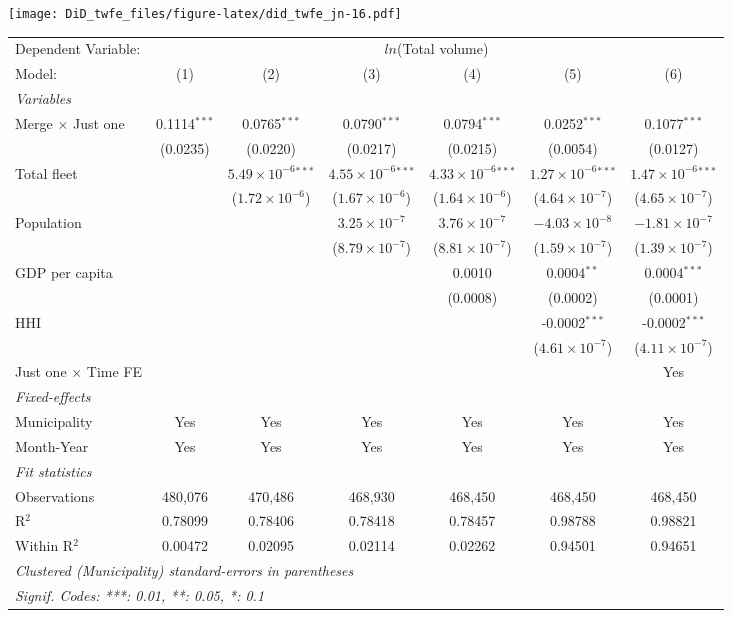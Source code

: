 \documentclass[
]{article}
\begin{document}
\texttt{[image: DiD\_twfe\_files/figure-latex/did\_twfe\_jn-16.pdf]}

\begin{tabular}{lcccccc}
\tabularnewline\midrule\midrule
Dependent Variable:&\multicolumn{6}{c}{$ln$(Total volume)}\\
Model:&(1) & (2) & (3) & (4) & (5) & (6)\\
\midrule \emph{Variables}&   &   &   &   &   &  \\
Merge $\times $ Just one & 0.1114$^{***}$ & 0.0765$^{***}$ & 0.0790$^{***}$ & 0.0794$^{***}$ & 0.0252$^{***}$ & 0.1077$^{***}$\\
  &(0.0235) & (0.0220) & (0.0217) & (0.0215) & (0.0054) & (0.0127)\\
Total fleet &    & $5.49\times 10^{-6}$$^{***}$ & $4.55\times 10^{-6}$$^{***}$ & $4.33\times 10^{-6}$$^{***}$ & $1.27\times 10^{-6}$$^{***}$ & $1.47\times 10^{-6}$$^{***}$\\
  &   & ($1.72\times 10^{-6}$) & ($1.67\times 10^{-6}$) & ($1.64\times 10^{-6}$) & ($4.64\times 10^{-7}$) & ($4.65\times 10^{-7}$)\\
Population &    &    & $3.25\times 10^{-7}$ & $3.76\times 10^{-7}$ & $-4.03\times 10^{-8}$ & $-1.81\times 10^{-7}$\\
  &   &    & ($8.79\times 10^{-7}$) & ($8.81\times 10^{-7}$) & ($1.59\times 10^{-7}$) & ($1.39\times 10^{-7}$)\\
GDP per capita &    &    &    & 0.0010 & 0.0004$^{**}$ & 0.0004$^{***}$\\
  &   &    &    & (0.0008) & (0.0002) & (0.0001)\\
HHI &    &    &    &    & -0.0002$^{***}$ & -0.0002$^{***}$\\
  &   &    &    &    & ($4.61\times 10^{-7}$) & ($4.11\times 10^{-7}$)\\
Just one $\times$ Time FE &  &  &  &  &  & Yes\\
\midrule \emph{Fixed-effects}&   &   &   &   &   &  \\
Municipality & Yes & Yes & Yes & Yes & Yes & Yes\\
Month-Year & Yes & Yes & Yes & Yes & Yes & Yes\\
\midrule \emph{Fit statistics}&  & & & & & \\
Observations & 480,076&470,486&468,930&468,450&468,450&468,450\\
R$^2$ & 0.78099&0.78406&0.78418&0.78457&0.98788&0.98821\\
Within R$^2$ & 0.00472&0.02095&0.02114&0.02262&0.94501&0.94651\\
\midrule\midrule\multicolumn{7}{l}{\emph{Clustered (Municipality) standard-errors in parentheses}}\\
\multicolumn{7}{l}{\emph{Signif. Codes: ***: 0.01, **: 0.05, *: 0.1}}\\
\end{tabular}
\end{document}

